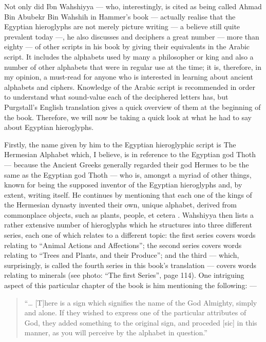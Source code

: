 	Not only did Ibn Wahshiyya — who, interestingly, is cited as being called Ahmad Bin Abubekr Bin Wahshih in Hammer’s book — actually realise that the Egyptian hieroglyphs are not merely picture writing — a believe still quite prevalent today —, he also discusses and deciphers a great number — more than eighty — of other scripts in his book by giving their equivalents in the Arabic script. It includes the alphabets used by many a philosopher or king and also a number of other alphabets that were in regular use at the time; it is, therefore, in my opinion, a must-read for anyone who is interested in learning about ancient alphabets and ciphers. Knowledge of the Arabic script is recommended in order to understand what sound-value each of the deciphered letters has, but Purgstall's English translation gives a quick overview of them at the beginning of the book. Therefore, we will now be taking a quick look at what he had to say about Egyptian hieroglyphs.

	Firstly, the name given by him to the Egyptian hieroglyphic script is The Hermesian Alphabet \parencite[p. 14]{wahshiyya} which, I believe, is in reference to the Egyptian god Thoth — because the Ancient Greeks generally regarded their god Hermes to be the same as the Egyptian god Thoth — who is, amongst a myriad of other things, known for being the supposed inventor of the Egyptian hieroglyphs and, by extent, writing itself. He continues by mentioning that each one of the kings of the Hermesian dynasty invented their own, unique alphabet, derived from commonplace objects, such as plants, people, et cetera \parencite[pp. 14-15]{wahshiyya}. Wahshiyya then lists a rather extensive number of hieroglyphs which he structures into three different series, each one of which relates to a different topic: the first series covers words relating to “Animal Actions and Affections”; the second series covers words relating to “Trees and Plants, and their Produce”; and the third — which, surprisingly, is called the fourth series in this book’s translation — covers words relating to minerals (see photo: “The first Series”, page 114). \parencite[pp. 19-40]{wahshiyya}
	One intriguing aspect of this particular chapter of the book is him mentioning the following: —

	\begin{quote}“… [T]here is a sign which signifies the name of the God Almighty, simply and alone. If they wished to express one of the particular attributes of God, they added something to the original sign, and proceded [sic] in this manner, as you will perceive by the alphabet in question.” \parencite[p. 16]{wahshiyya}\end{quote}

